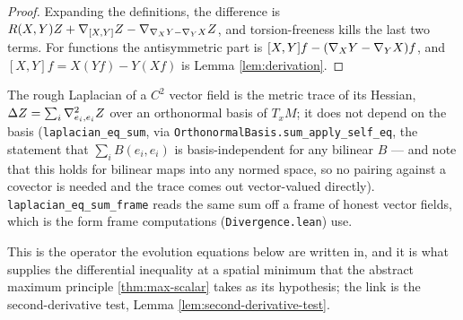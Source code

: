 \begin{proof}
  \leanok
  Expanding the definitions, the difference is
  $R(X,Y)Z + \nabla_{[X,Y]}Z - \nabla_{\nabla_X Y - \nabla_Y X} Z$, and torsion-freeness
  kills the last two terms. For functions the antisymmetric part is
  $[X,Y]f - (\nabla_X Y - \nabla_Y X)f$, and $[X,Y]f = X(Yf) - Y(Xf)$ is
  Lemma \ref{lem:derivation}.
\end{proof}

\begin{definition}[Laplacian]
  \label{def:laplacian}
  \leanok
  The rough Laplacian of a $C^2$ vector field is the metric trace of its
  Hessian, $\Delta Z = \sum_i \nabla^2_{e_i,e_i} Z$ over an orthonormal basis of
  $T_xM$; it does not depend on the basis (\texttt{laplacian\_eq\_sum}, via
  \texttt{OrthonormalBasis.sum\_apply\_self\_eq}, the statement that
  $\sum_i B(e_i,e_i)$ is basis-independent for any bilinear $B$ --- and note
  that this holds for bilinear maps into any normed space, so no pairing
  against a covector is needed and the trace comes out vector-valued
  directly). \texttt{laplacian\_eq\_sum\_frame} reads the same sum off a
  frame of honest vector fields, which is the form frame computations
  (\texttt{Divergence.lean}) use.

  This is the operator the evolution equations below are written in, and it
  is what supplies the differential inequality at a spatial minimum that the
  abstract maximum principle \ref{thm:max-scalar} takes as its hypothesis;
  the link is the second-derivative test, Lemma \ref{lem:second-derivative-test}.
\end{definition}

